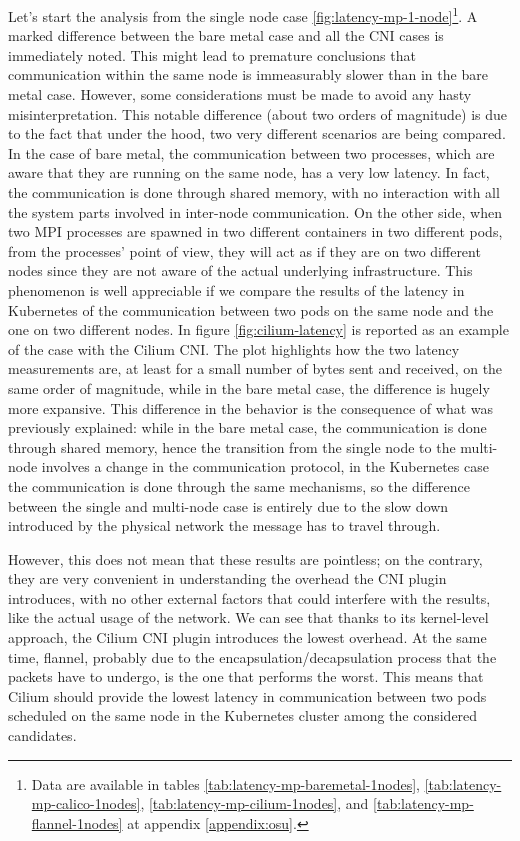 Let's start the analysis from the single node case
\ref{fig:latency-mp-1-node}\footnote{Data are available in tables
  \ref{tab:latency-mp-baremetal-1nodes}, \ref{tab:latency-mp-calico-1nodes},
  \ref{tab:latency-mp-cilium-1nodes}, and \ref{tab:latency-mp-flannel-1nodes} at
  appendix \ref{appendix:osu}.}.
A marked difference between the bare metal case and all the CNI cases is
immediately noted. This might lead to premature conclusions that communication
within the same node is immeasurably slower than in the bare metal case.
However, some considerations must be made to avoid any hasty misinterpretation.
This notable difference (about two orders of magnitude) is due to the fact that
under the hood, two very different scenarios are being compared.
In the case of bare metal, the communication between two processes, which are
aware that they are running on the same node, has a very low latency. In fact,
the communication is done through shared memory, with no interaction with all
the system parts involved in inter-node communication.
On the other side, when two MPI processes are spawned in two different
containers in two different pods, from the processes' point of view, they will
act as if they are on two different nodes since they are not aware of the actual
underlying infrastructure.
This phenomenon is well appreciable if we compare the results of the latency in
Kubernetes of the communication between two pods on the same node and the one on
two different nodes. In figure \ref{fig:cilium-latency} is reported as an
example of the case with the Cilium CNI.
The plot highlights how the two latency measurements are, at least for a small
number of bytes sent and received, on the same order of magnitude, while in the
bare metal case, the difference is hugely more expansive. This difference in the
behavior is the consequence of what was previously explained: while in the bare
metal case, the communication is done through shared memory, hence the
transition from the single node to the multi-node involves a change in the
communication protocol, in the Kubernetes case the communication is done through
the same mechanisms, so the difference between the single and multi-node case is
entirely due to the slow down introduced by the physical network the message has
to travel through.

However, this does not mean that these results are pointless; on the contrary,
they are very convenient in understanding the overhead the CNI plugin
introduces, with no other external factors that could interfere with the
results, like the actual usage of the network.
We can see that thanks to its kernel-level approach, the Cilium CNI plugin
introduces the lowest overhead. At the same time, flannel, probably due to the
encapsulation/decapsulation process that the packets have to undergo, is the one
that performs the worst.
This means that Cilium should provide the lowest latency in communication
between two pods scheduled on the same node in the Kubernetes cluster among the
considered candidates.

